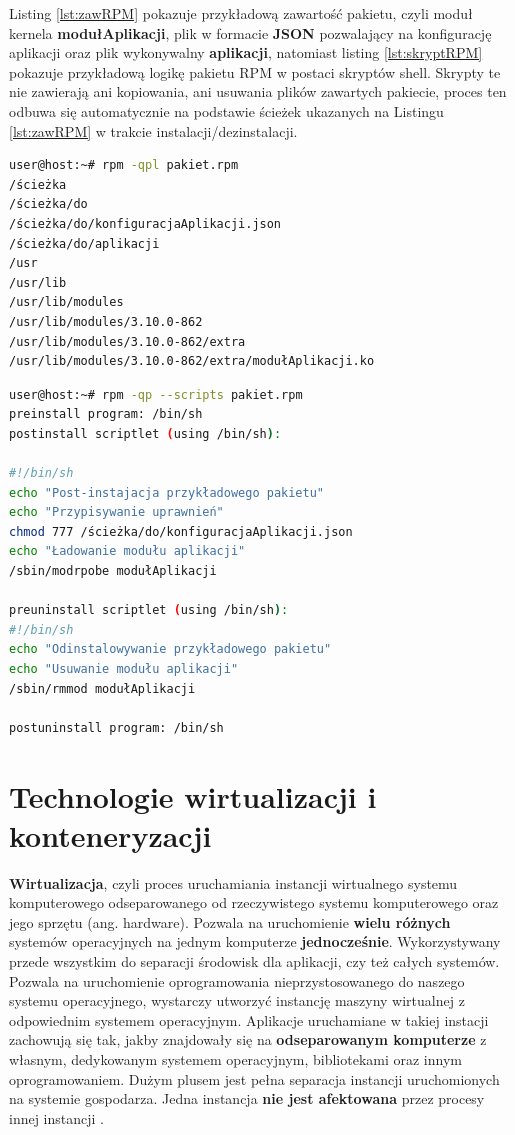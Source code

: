 Listing \ref{lst:zawRPM} pokazuje przykładową zawartość pakietu, czyli moduł kernela \textbf{modułAplikacji}, plik w formacie \textbf{JSON} pozwalający na konfigurację aplikacji oraz plik wykonywalny \textbf{aplikacji}, natomiast  listing \ref{lst:skryptRPM} pokazuje przykładową logikę pakietu RPM w postaci skryptów shell. Skrypty te nie zawierają ani kopiowania, ani usuwania plików zawartych pakiecie, proces ten odbuwa się automatycznie na podstawie ścieżek ukazanych na Listingu \ref{lst:zawRPM} w trakcie instalacji/dezinstalacji.

\begin{lstlisting}[language=bash,caption={Przykładowa zawartość pakietu RPM},label={lst:zawRPM}]
user@host:~# rpm -qpl pakiet.rpm
/ścieżka
/ścieżka/do
/ścieżka/do/konfiguracjaAplikacji.json
/ścieżka/do/aplikacji
/usr
/usr/lib
/usr/lib/modules
/usr/lib/modules/3.10.0-862
/usr/lib/modules/3.10.0-862/extra
/usr/lib/modules/3.10.0-862/extra/modułAplikacji.ko
\end{lstlisting}

\newpage

\begin{lstlisting}[label={lst:skryptRPM}, language=bash, caption={Skrypty pakietu RPM}]
user@host:~# rpm -qp --scripts pakiet.rpm
preinstall program: /bin/sh
postinstall scriptlet (using /bin/sh):

#!/bin/sh
echo "Post-instajacja przykładowego pakietu"
echo "Przypisywanie uprawnień"
chmod 777 /ścieżka/do/konfiguracjaAplikacji.json
echo "Ładowanie modułu aplikacji"
/sbin/modrpobe modułAplikacji

preuninstall scriptlet (using /bin/sh):
#!/bin/sh
echo "Odinstalowywanie przykładowego pakietu"
echo "Usuwanie modułu aplikacji"
/sbin/rmmod modułAplikacji

postuninstall program: /bin/sh
\end{lstlisting}

\section{Technologie wirtualizacji i konteneryzacji}

\textbf{Wirtualizacja}, czyli proces uruchamiania instancji wirtualnego systemu komputerowego odseparowanego od rzeczywistego systemu komputerowego oraz jego sprzętu (ang. hardware). Pozwala na uruchomienie \textbf{wielu różnych} systemów operacyjnych na jednym komputerze \textbf{jednocześnie}. Wykorzystywany przede wszystkim do separacji środowisk dla aplikacji, czy też całych systemów. Pozwala na uruchomienie oprogramowania nieprzystosowanego do naszego systemu operacyjnego, wystarczy utworzyć instancję maszyny wirtualnej z odpowiednim systemem operacyjnym. Aplikacje uruchamiane w takiej instacji zachowują się tak, jakby znajdowały się na \textbf{odseparowanym komputerze} z własnym, dedykowanym systemem operacyjnym, bibliotekami oraz innym oprogramowaniem. Dużym plusem jest pełna separacja instancji uruchomionych na systemie gospodarza. Jedna instancja \textbf{nie jest afektowana} przez procesy innej instancji \cite{Virt}.\par

